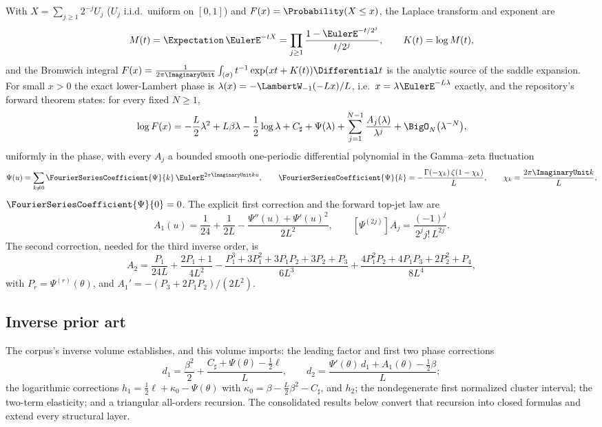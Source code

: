\documentclass[11pt,oneside]{article}
\numberwithin{equation}{section}
\theoremstyle{definition}
\theoremstyle{remark}
\newcommand{\Csharp}{C_{\sharp}}
\begin{document}
With $X=\sum_{j\ge1}2^{-j}U_j$ ($U_j$ i.i.d.\ uniform on $[0,1]$) and
$F(x)=\Probability(X\le x)$, the Laplace transform and exponent are
\begin{equation}
 M(t)=\Expectation\,\EulerE^{-tX}
 =\prod_{j\ge1}\frac{1-\EulerE^{-t/2^{j}}}{t/2^{j}},
 \qquad
 K(t)=\log M(t),
 \label{eq:K-def}
\end{equation}
and the Bromwich integral
$F(x)=\frac1{2\pi\ImaginaryUnit}\int_{(\sigma)}t^{-1}\exp(xt+K(t))\Differential t$ is the
analytic source of the saddle expansion.  For small $x>0$ the exact
lower-Lambert phase is
$\lambda(x)=-\LambertW_{-1}(-Lx)/L$, i.e.\
$x=\lambda\EulerE^{-L\lambda}$ exactly, and the repository's forward
theorem states: for every fixed $N\ge1$,
\begin{equation}
 \log F(x)=
 -\frac L2\lambda^{2}+L\beta\lambda-\frac12\log\lambda
 +\Csharp+\Psi(\lambda)
 +\sum_{j=1}^{N-1}\frac{A_j(\lambda)}{\lambda^{j}}
 +\BigO_N\bigl(\lambda^{-N}\bigr),
 \label{eq:forward-all-orders}
\end{equation}
uniformly in the phase, with every $A_j$ a bounded smooth one-periodic
differential polynomial in the Gamma--zeta fluctuation
\begin{equation}
 \Psi(u)=\sum_{k\ne0}\FourierSeriesCoefficient{\Psi}{k}\,\EulerE^{2\pi\ImaginaryUnit ku},
 \qquad
 \FourierSeriesCoefficient{\Psi}{k}=-\frac{\Gamma(-\chi_k)\,\zeta(1-\chi_k)}{L},
 \qquad
 \chi_k=\frac{2\pi\ImaginaryUnit k}{L},
 \label{eq:Psi-Fourier}
\end{equation}
$\FourierSeriesCoefficient{\Psi}{0}=0$.  The explicit first correction and the forward
top-jet law are
\begin{equation}
 A_1(u)=\frac1{24}+\frac1{2L}
 -\frac{\Psi''(u)+\Psi'(u)^{2}}{2L^{2}},
 \qquad
 [\Psi^{(2j)}]A_j=\frac{(-1)^{j}}{2^{j}j!\,L^{2j}}.
 \label{eq:A1-and-topjet}
\end{equation}
The second correction, needed for the third inverse order, is
\begin{equation}
 A_2=\frac{P_1}{24L}+\frac{2P_1+1}{4L^{2}}
 -\frac{P_1^{3}+3P_1^{2}+3P_1P_2+3P_2+P_3}{6L^{3}}
 +\frac{4P_1^{2}P_2+4P_1P_3+2P_2^{2}+P_4}{8L^{4}},
 \label{eq:A2}
\end{equation}
with $P_r=\Psi^{(r)}(\theta)$, and
$A_1'=-(P_3+2P_1P_2)/(2L^{2})$.

\subsection{Inverse prior art}

The corpus's inverse volume establishes, and this volume imports: the
leading factor and first two phase corrections
\begin{equation}
 d_1=\frac{\beta^{2}}2
 +\frac{\Csharp+\Psi(\theta)-\tfrac12\ell}{L},
 \qquad
 d_2=\frac{\Psi'(\theta)\,d_1+A_1(\theta)-\tfrac12\beta}{L};
 \label{eq:d1-d2}
\end{equation}
the logarithmic corrections
$h_1=\tfrac12\ell+\kappa_0-\Psi(\theta)$ with
$\kappa_0=\beta-\tfrac L2\beta^{2}-\Csharp$, and $h_2$; the
nondegenerate first normalized cluster interval; the two-term
elasticity; and a triangular all-orders recursion.  The consolidated
results below convert that recursion into closed formulas and extend
every structural layer.
\end{document}
